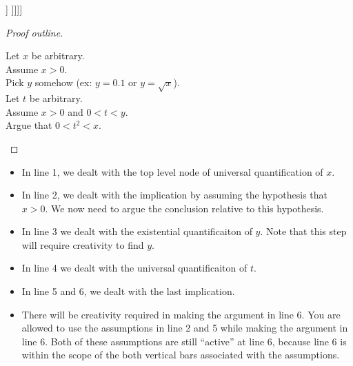 \documentclass{article}
\begin{document}
\begin{center}
		\begin{forest}
				[$\forall x \in \mathbb{R}$ [$\implies$[$x>0$][ $\exists y \in \mathbb{R}$ [ $\forall t \in \mathbb{R}$ [$\implies$ [$0<t<y$][$0<t^2<x$]] ]]]]
			\end{forest}
	\end{center}

\begin{proof}[Proof outline]
	
				\leavevmode\newline
				
		\begin{fitch}
				\textrm{Let $x$ be arbitrary.}\\
				\textrm {Assume $x > 0$.}\\
				\fa \textrm{Pick $y$ somehow (ex:  $y = 0.1$ or $y = \sqrt{x}$)}.\\
				\fa \textrm{Let $t$ be arbitrary.}\\
				\fa \textrm{Assume $x>0$ and $0<t<y$}.\\
				\fa \fa \textrm{Argue that $0<t^2<x$.}
			\end{fitch}
		
	\end{proof}

\begin{itemize}
\item In line 1, we dealt with the top level node of universal quantification of $x$.
\item In line 2, we dealt with the implication by assuming the hypothesis that $x>0$.  We now need to argue the conclusion relative to this hypothesis.
\item In line 3 we dealt with the existential quantificaiton of $y$.  Note that this step will require creativity to find $y$.
\item In line 4 we dealt with the universal quantificaiton of $t$.
\item In line 5 and 6, we dealt with the last implication.
\item There will be creativity required in making the argument in line 6.  You are allowed to use the assumptions in line 2 and 5 while making the argument in line 6.  Both of these assumptions are still ``active'' at line 6, because line 6 is within the scope of the both vertical bars associated with the assumptions.
\end{itemize}

\newpage
\end{document}
